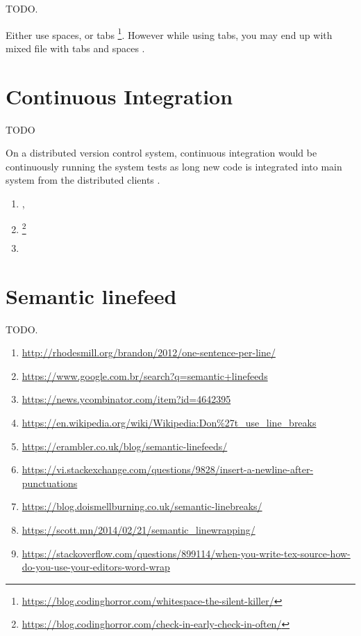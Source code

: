     TODO.

    Either use spaces, or tabs
    \footnote{\url{https://blog.codinghorror.com/whitespace-the-silent-killer/}}.
    However while using tabs,
    you may end up with mixed file with tabs and spaces \cite{tabsAndSpacesConversion}.



    \section{Continuous Integration}

    TODO

    On a distributed version control system,
    continuous integration would be continuously running the system tests
    as long new code is integrated into main system
    from the distributed clients \cite{continuousIntegration}.

    \begin{enumerate}[leftmargin=*]
        \item {},
        \item \footnote{\url{https://blog.codinghorror.com/check-in-early-check-in-often/}}
        \item \cite{aspectOriented}
    \end{enumerate}



    \section{Semantic linefeed}

    TODO.

    \begin{enumerate}[leftmargin=*]
        \item \url{http://rhodesmill.org/brandon/2012/one-sentence-per-line/}
        \item \url{https://www.google.com.br/search?q=semantic+linefeeds}
        \item \url{https://news.ycombinator.com/item?id=4642395}
        \item \url{https://en.wikipedia.org/wiki/Wikipedia:Don%27t_use_line_breaks}
        \item \url{https://erambler.co.uk/blog/semantic-linefeeds/}
        \item \url{https://vi.stackexchange.com/questions/9828/insert-a-newline-after-punctuations}
        \item \url{https://blog.doismellburning.co.uk/semantic-linebreaks/}
        \item \url{https://scott.mn/2014/02/21/semantic_linewrapping/}
        \item \url{https://stackoverflow.com/questions/899114/when-you-write-tex-source-how-do-you-use-your-editors-word-wrap}
    \end{enumerate}


